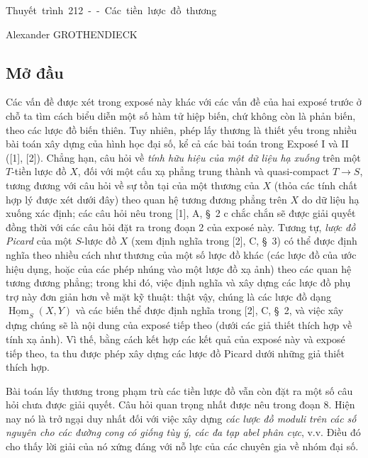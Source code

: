 \unit{Thuyết trình 212 -- Các tiền lược đồ thương}
%
  {Alexander GROTHENDIECK}

\subsection*{Mở đầu}

Các vấn đề được xét trong exposé này khác với các vấn đề của hai exposé trước
ở chỗ ta tìm cách biểu diễn một số hàm tử hiệp biến, chứ không còn là phản
biến, theo các lược đồ biến thiên. Tuy nhiên, phép lấy thương là thiết yếu
trong nhiều bài toán xây dựng của hình học đại số, kể cả các bài toán trong
Exposé I và II ([1], [2]). Chẳng hạn, câu hỏi về \emph{tính hữu hiệu của một
dữ liệu hạ xuống} trên một $T$-tiền lược đồ $X$, đối với một cấu xạ phẳng
trung thành và quasi-compact $T\longrightarrow S$, tương đương với câu hỏi về
sự tồn tại của một thương của $X$ (thỏa các tính chất hợp lý được xét dưới
đây) theo quan hệ tương đương phẳng trên $X$ do dữ liệu hạ xuống xác định; các
câu hỏi nêu trong [1], A, \S~2 c chắc chắn sẽ được giải quyết đồng thời với
các câu hỏi đặt ra trong đoạn 2 của exposé này. Tương tự, \emph{lược đồ
Picard} của một $S$-lược đồ $X$ (xem định nghĩa trong [2], C, \S~3) có thể
được định nghĩa theo nhiều cách như thương của một số lược đồ khác (các lược
đồ của ước hiệu dụng, hoặc của các phép nhúng vào một lược đồ xạ ảnh) theo
các quan hệ tương đương phẳng; trong khi đó, việc định nghĩa và xây dựng các
lược đồ phụ trợ này đơn giản hơn về mặt kỹ thuật: thật vậy, chúng là các lược
đồ dạng $\underline{\operatorname{Hom}}_S(X,Y)$ và các biến thể được định
nghĩa trong [2], C, \S~2, và việc xây dựng chúng sẽ là nội dung của exposé
tiếp theo (dưới các giả thiết thích hợp về tính xạ ảnh). Vì thế, bằng cách kết
hợp các kết quả của exposé này và exposé tiếp theo, ta thu được phép xây dựng
các lược đồ Picard dưới những giả thiết thích hợp.

Bài toán lấy thương trong phạm trù các tiền lược đồ vẫn còn đặt ra một số câu
hỏi chưa được giải quyết. Câu hỏi quan trọng nhất được nêu trong đoạn 8. Hiện
nay nó là trở ngại duy nhất đối với việc xây dựng \emph{các lược đồ moduli
trên các số nguyên cho các đường cong có giống tùy ý, các đa tạp abel phân
cực}, v.v. Điều đó cho thấy lời giải của nó xứng đáng với nỗ lực của các
chuyên gia về nhóm đại số.
